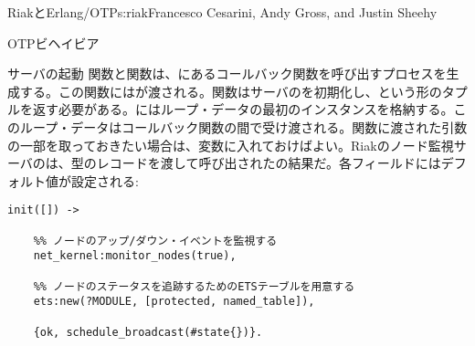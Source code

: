 \begin{aosachapter}{RiakとErlang/OTP}{s:riak}{Francesco Cesarini, Andy Gross, and Justin Sheehy}
\begin{aosasect1}{OTPビヘイビア}
\begin{aosasect2}{サーバの起動}
関数と関数は、にあるコールバック関数を呼び出すプロセスを生成する。この関数にはが渡される。関数はサーバのを初期化し、という形のタプルを返す必要がある。にはループ・データの最初のインスタンスを格納する。このループ・データはコールバック関数の間で受け渡される。関数に渡された引数の一部を取っておきたい場合は、変数に入れておけばよい。Riakのノード監視サーバのは、型のレコードを渡して呼び出されたの結果だ。各フィールドにはデフォルト値が設定される:





\begin{verbatim}
init([]) ->

    %% ノードのアップ/ダウン・イベントを監視する
    net_kernel:monitor_nodes(true),

    %% ノードのステータスを追跡するためのETSテーブルを用意する
    ets:new(?MODULE, [protected, named_table]),

    {ok, schedule_broadcast(#state{})}.
\end{verbatim}



\end{aosasect2}
\end{aosasect1}
\end{aosachapter}

